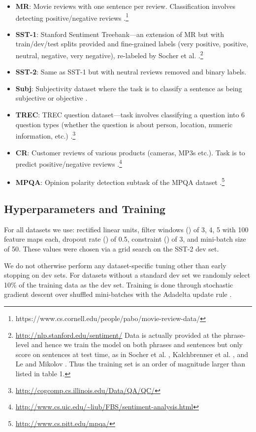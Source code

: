 \documentclass[11pt]{article}
\begin{document}
\begin{itemize}
  \item \textbf{MR}: Movie reviews with one sentence per review. Classification involves detecting positive/negative reviews \cite{Pang:2005}.\footnote{https://www.cs.cornell.edu/people/pabo/movie-review-data/}
 \item \textbf{SST-1}: Stanford Sentiment Treebank---an extension of MR but with train/dev/test splits provided and fine-grained labels (very  positive, positive, neutral, negative, very negative), re-labeled by Socher et al. .\footnote{\url{http://nlp.stanford.edu/sentiment/} Data is actually provided at the phrase-level and hence we train the model on both phrases and sentences but only score on sentences at test time, as in Socher et al. , Kalchbrenner et al. , and Le and Mikolov . Thus the training set is an order of magnitude larger than listed in table 1.}
 \item \textbf{SST-2}: Same as SST-1 but with neutral reviews removed and binary labels.
 \item \textbf{Subj}: Subjectivity dataset where the task is to classify a sentence as being subjective or objective \cite{Pang:2004}.
  \item \textbf{TREC}: TREC question dataset---task involves classifying a question into 6 question types (whether the question is about person, location, numeric information, etc.) \cite{Li:2002}.\footnote{\url{http://cogcomp.cs.illinois.edu/Data/QA/QC/}}
  \item \textbf{CR}: Customer reviews of various products (cameras, MP3s etc.). Task is to predict positive/negative reviews \cite{Hu:2004}.\footnote{\url{http://www.cs.uic.edu/~liub/FBS/sentiment-analysis.html}}
  \item \textbf{MPQA}: Opinion polarity detection subtask of the MPQA dataset \cite{Wiebe:2005}.\footnote{\url{http://www.cs.pitt.edu/mpqa/}}
\end{itemize}
\subsection{Hyperparameters and Training}
For all datasets we use: rectified linear units, filter windows () of 3, 4, 5 with 100 feature maps each, dropout rate () of 0.5,  constraint () of 3, and mini-batch size of 50. These values were chosen via a grid search on the SST-2 dev set.

We do not otherwise perform any dataset-specific tuning other than early stopping on dev sets. For datasets without a standard dev set we randomly select 10\% of the training data as the dev set. Training is done through stochastic gradient descent over shuffled mini-batches with the Adadelta update rule \cite{Zeiler:2012}.
\end{document}
